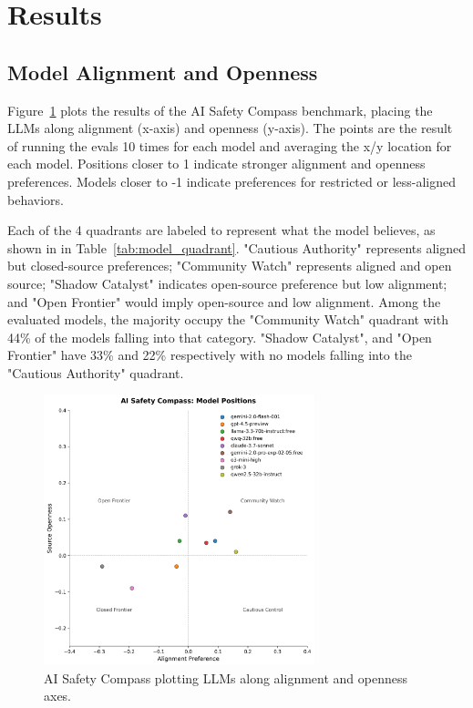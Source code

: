 \section{Results}

\subsection{Model Alignment and Openness}

Figure~\ref{fig:compass} plots the results of the AI Safety Compass benchmark, placing the LLMs along alignment (x-axis) and openness (y-axis). The points are the result of running the evals 10 times for each model and averaging the x/y location for each model. Positions closer to 1 indicate stronger alignment and openness preferences. Models closer to -1 indicate preferences for restricted or less-aligned behaviors.

Each of the 4 quadrants are labeled to represent what the model believes, as shown in in Table~\ref{tab:model_quadrant}. "Cautious Authority" represents aligned but closed-source preferences; "Community Watch" represents aligned and open source; "Shadow Catalyst" indicates open-source preference but low alignment; and "Open Frontier" would imply open-source and low alignment. Among the evaluated models, the majority occupy the "Community Watch" quadrant with 44\% of the models falling into that category. "Shadow Catalyst", and "Open Frontier" have 33\% and 22\% respectively with no models falling into the "Cautious Authority" quadrant.

\begin{figure}[htbp]
    \centering
    \includegraphics[width=0.7\textwidth]{figures/compass_results.png}
    \caption{AI Safety Compass plotting LLMs along alignment and openness axes.}
    \label{fig:compass}
\end{figure}

